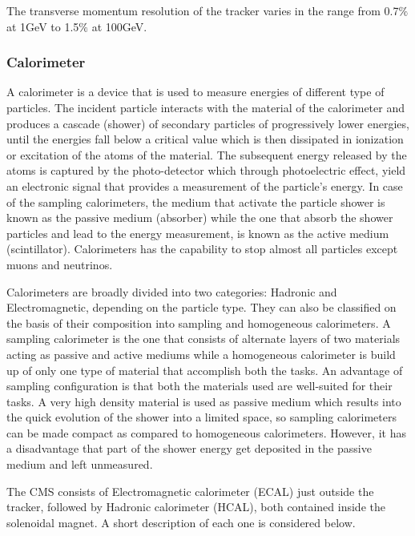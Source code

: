   The transverse momentum resolution of the tracker varies in the range from 0.7$\%$ at 1\unit{GeV} to 1.5$\%$ at 100\unit{GeV}.

\subsubsection{Calorimeter}
A calorimeter is a device that is used to measure energies of different type of particles. The incident particle interacts with the material of the calorimeter and
produces a cascade (shower) of secondary particles of progressively lower energies, until the energies fall below a critical value which is then
dissipated in ionization or excitation of the atoms of the material. The subsequent energy released by the atoms is captured by the photo-detector which through
photoelectric effect, yield an electronic signal that provides a measurement of the particle's energy.
In case of the sampling calorimeters, the medium that activate the particle shower is known as the passive medium (absorber)
while the one that absorb the shower particles and lead to the energy measurement, is known as the active medium (scintillator).
Calorimeters has the capability to stop almost all particles except muons and neutrinos. 

Calorimeters are broadly divided into two categories: Hadronic and Electromagnetic, depending on the particle type. They can also be classified
on the basis of their composition into sampling and homogeneous calorimeters. A sampling calorimeter is the one that consists of alternate layers of
two materials acting as passive and active mediums while a homogeneous calorimeter is build up of only one type of material that accomplish both the tasks.
An advantage of sampling configuration is that both the materials used are well-suited for their tasks. A very high density material is used as passive medium
which results into the quick evolution of the shower into a limited space, so sampling calorimeters can be made compact as compared to homogeneous calorimeters.
However, it has a disadvantage that part of the shower energy get deposited in the passive medium and left unmeasured. 

The CMS consists of Electromagnetic calorimeter (ECAL) just outside the tracker, followed by Hadronic calorimeter (HCAL), both contained inside the solenoidal magnet.
A short description of each one is considered below.

